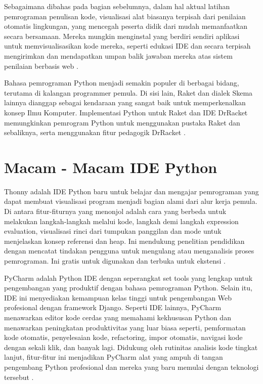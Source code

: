 Sebagaimana dibahas pada bagian sebelumnya, dalam hal aktual latihan pemrograman penulisan kode, visualisasi alat biasanya terpisah dari penilaian otomatis lingkungan, yang mencegah peserta didik dari mudah memanfaatkan secara bersamaan. Mereka mungkin menginstal yang berdiri sendiri aplikasi untuk memvisualisasikan kode mereka, seperti edukasi IDE dan secara terpisah mengirimkan dan mendapatkan umpan balik jawaban mereka atas sistem penilaian berbasis web \cite{helminen2010jype}.

Bahasa pemrograman Python menjadi semakin populer di berbagai bidang, terutama di kalangan programmer pemula. Di sisi lain, Raket dan dialek Skema lainnya dianggap sebagai kendaraan yang sangat baik untuk memperkenalkan konsep Ilmu Komputer. Implementasi Python untuk Raket dan IDE DrRacket memungkinkan pemrogram Python untuk menggunakan pustaka Raket dan sebaliknya, serta menggunakan fitur pedagogik DrRacket \cite {ramos2014implementing}.

\section{Macam - Macam IDE Python}
	Thonny adalah IDE Python baru untuk belajar dan mengajar pemrograman yang dapat membuat visualisasi program menjadi bagian alami dari alur kerja pemula.
Di antara fitur-fiturnya yang menonjol adalah cara yang berbeda untuk melakukan langkah-langkah melalui kode, langkah demi langkah expression evaluation, visualisasi rinci dari tumpukan panggilan dan mode untuk menjelaskan konsep referensi dan heap. Ini mendukung penelitian pendidikan dengan mencatat tindakan pengguna untuk mengulang atau menganalisis proses pemrograman. Ini gratis untuk digunakan dan terbuka untuk ekstensi \cite{annamaa2015introducing}.

	PyCharm adalah Python IDE dengan seperangkat set tools yang lengkap untuk pengembangan yang produktif dengan bahasa pemrograman Python. Selain itu, IDE ini menyediakan kemampuan kelas tinggi untuk pengembangan Web profesional dengan framework Django. Seperti IDE lainnya, PyCharm menawarkan editor kode cerdas yang memahami kekhususan Python dan menawarkan peningkatan produktivitas yang luar biasa seperti, pemformatan kode otomatis, penyelesaian kode, refactoring, impor otomatis, navigasi kode dengan sekali klik, dan banyak lagi. Didukung oleh rutinitas analisis kode tingkat lanjut, fitur-fitur ini menjadikan PyCharm alat yang ampuh di tangan pengembang Python profesional dan mereka yang baru memulai dengan teknologi tersebut \cite{fifli2016pirhoogammarhoalphamumualpha}.

